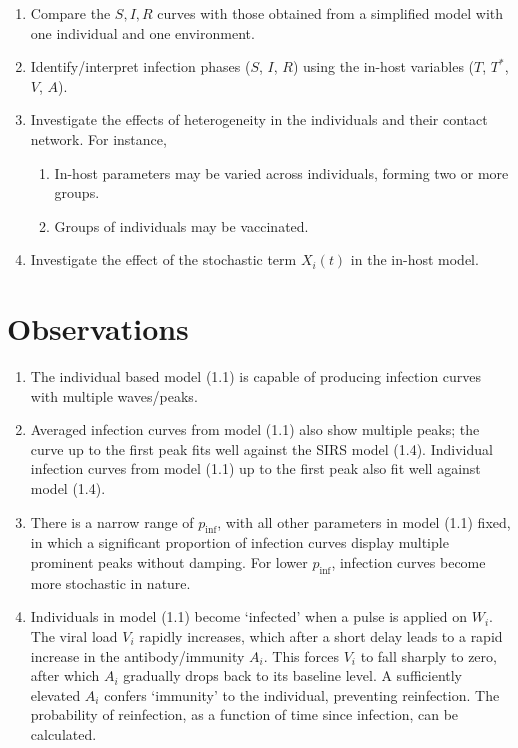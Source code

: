 \documentclass[11pt]{article}
\begin{document}
    \begin{enumerate}
        \item Compare the $S, I, R$ curves with those obtained from a
        simplified model with one individual and one environment.

        \item Identify/interpret infection phases ($S$, $I$, $R$) using the
        in-host variables ($T$, $T^*$, $V$, $A$).

        \item Investigate the effects of heterogeneity in the individuals and
        their contact network. For instance,
        \begin{enumerate}
            \item In-host parameters may be varied across individuals, forming
            two or more groups.
            \item Groups of individuals may be vaccinated.
        \end{enumerate}

        \item Investigate the effect of the stochastic term $X_i(t)$ in the
        in-host model.
    \end{enumerate}


    \section{Observations}

    \begin{enumerate}
        \item The individual based model (1.1) is capable of producing
        infection curves with multiple waves/peaks.

        \item Averaged infection curves from model (1.1) also show multiple
        peaks; the curve up to the first peak fits well against the SIRS model
        (1.4). Individual infection curves from model (1.1) up to the first
        peak also fit well against model (1.4).

        \item There is a narrow range of $p_\text{inf}$, with all other
        parameters in model (1.1) fixed, in which a significant proportion of
        infection curves display multiple prominent peaks without damping. For
        lower $p_\text{inf}$, infection curves become more stochastic in
        nature.

        \item Individuals in model (1.1) become `infected' when a pulse is
        applied on $W_i$. The viral load $V_i$ rapidly increases, which after
        a short delay leads to a rapid increase in the antibody/immunity
        $A_i$. This forces $V_i$ to fall sharply to zero, after which $A_i$
        gradually drops back to its baseline level. A sufficiently elevated
        $A_i$ confers `immunity' to the individual, preventing reinfection.
        The probability of reinfection, as a function of time since infection,
        can be calculated.
    \end{enumerate}
\end{document}
